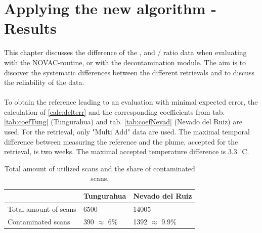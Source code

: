 \documentclass  [
  paper    = a4,
  BCOR     = 10mm,
  twoside,
  fontsize = 12pt,
  fleqn,
  toc      = bibnumbered,
  toc      = listofnumbered,
  numbers  = noendperiod,
  headings = normal,
  listof   = leveldown,
  version  = 3.03
]                                       {scrreprt}
\newcommand{\myrowcolour}{\rowcolor[gray]{0.925}}
\begin{document}
 \chapter{Applying the new algorithm -Results}
This chapter discusses the difference of the ,  and /  ratio data when evaluating with the NOVAC-routine, or with the decontamination module.
The aim is to discover the systematic differences between the different retrievals and to discuss the reliability of the data.\\
\\
To obtain the reference leading to an evaluation with minimal expected   error, the calculation of \cref{calc:delterr} and the corresponding coefficients from tab. \ref{tab:coefTung} (Tungurahua) and tab. \ref{tab:coefNevad} (Nevado del Ruiz) are used. 
For the retrieval, only "Multi Add" data are used. The maximal temporal difference between measuring the reference and the plume, accepted for the retrieval, is two weeks. The maximal accepted temperature difference is 3.3 $^{\circ}$C.\\
\begin{table}[h]
	\caption{Total amount of utilized scans and the share of contaminated scans.}
	\begin{tabular}{p{6cm}p{4cm}p{4cm}}
		&Tungurahua&Nevado del Ruiz\\
		\toprule
		Total amount of scans&6500&14005\\
		\myrowcolour
		Contaminated scans&390 $\approx$ 6\%&1392 $\approx$ 9.9\% \\
		\bottomrule            
	\end{tabular}	
	\label{tab:calc0}
\end{table}
%
\end{document}
